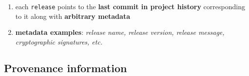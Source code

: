 \documentclass[11pt]{article}
\providecommand{\tightlist}{%
      \setlength{\itemsep}{0pt}\setlength{\parskip}{0pt}}
\begin{document}
\begin{enumerate}
\begin{itemize}
    \begin{enumerate}
    \def\labelenumii{\arabic{enumii}.}
    \tightlist
    \item
      each \texttt{release} points to the \textbf{last commit in project
      history} corresponding to it along with \textbf{arbitrary
      metadata}
    \item
      \textbf{metadata examples}: \emph{release name, release version,
      release message, cryptographic signatures, etc.}
    \end{enumerate}
  \end{itemize}
\end{enumerate}

\hypertarget{provenance-information}{%
\subsection{Provenance information}\label{provenance-information}}
\end{document}
